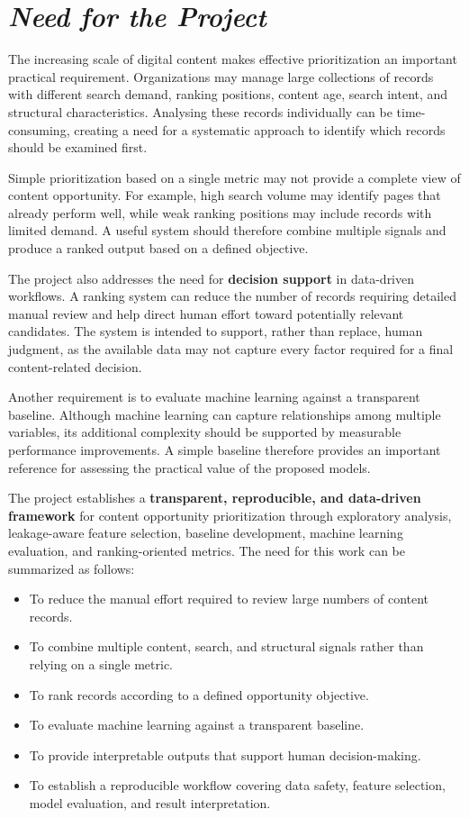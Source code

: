 \documentclass[12pt,a4paper]{report}
\begin{document}
\section{\textit{Need for the Project}}
The increasing scale of digital content makes effective prioritization an important practical requirement. Organizations may manage large collections of records with different search demand, ranking positions, content age, search intent, and structural characteristics. Analysing these records individually can be time-consuming, creating a need for a systematic approach to identify which records should be examined first.

Simple prioritization based on a single metric may not provide a complete view of content opportunity. For example, high search volume may identify pages that already perform well, while weak ranking positions may include records with limited demand. A useful system should therefore combine multiple signals and produce a ranked output based on a defined objective.

The project also addresses the need for \textbf{decision support} in data-driven workflows. A ranking system can reduce the number of records requiring detailed manual review and help direct human effort toward potentially relevant candidates. The system is intended to support, rather than replace, human judgment, as the available data may not capture every factor required for a final content-related decision.

Another requirement is to evaluate machine learning against a transparent baseline. Although machine learning can capture relationships among multiple variables, its additional complexity should be supported by measurable performance improvements. A simple baseline therefore provides an important reference for assessing the practical value of the proposed models.

The project establishes a \textbf{transparent, reproducible, and data-driven framework} for content opportunity prioritization through exploratory analysis, leakage-aware feature selection, baseline development, machine learning evaluation, and ranking-oriented metrics. The need for this work can be summarized as follows:

\begin{itemize}[leftmargin=*]
\item To reduce the manual effort required to review large numbers of content records.
\item To combine multiple content, search, and structural signals rather than relying on a single metric.
\item To rank records according to a defined opportunity objective.
\item To evaluate machine learning against a transparent baseline.
\item To provide interpretable outputs that support human decision-making.
\item To establish a reproducible workflow covering data safety, feature selection, model evaluation, and result interpretation.
\end{itemize}
\end{document}
